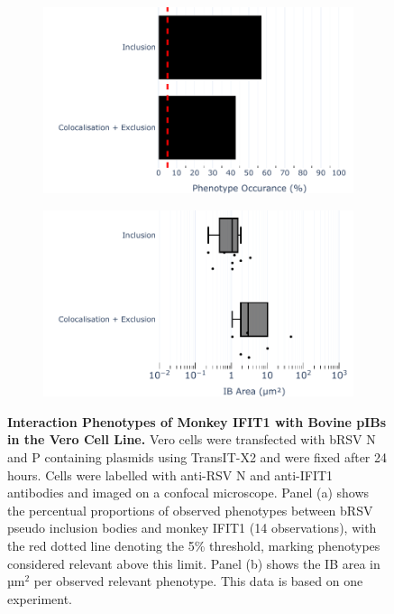 \begin{figure}
    \begin{subfigure}{0.495\textwidth}
        \caption{}
        \includegraphics[width=1\linewidth]{09. Chapter 4/Figs/01. pIB/02. IFIT1/07. bar_i1_vero_bnbp.pdf}  
    \end{subfigure}
    \begin{subfigure}{0.495\textwidth}
        \caption{}
        \includegraphics[width=1\linewidth]{09. Chapter 4/Figs/01. pIB/02. IFIT1/08. box_i1_vero_bnbp.pdf}
    \end{subfigure}
    \caption[Interaction Phenotypes of Monkey IFIT1 with Bovine pIBs in the Vero Cell Line.]{\textbf{Interaction Phenotypes of Monkey IFIT1 with Bovine pIBs in the Vero Cell Line.} Vero cells were transfected with bRSV N and P containing plasmids using TransIT-X2 and were fixed after 24 hours. Cells were labelled with anti-RSV N and anti-IFIT1 antibodies and imaged on a confocal microscope. Panel (a) shows the percentual proportions of observed phenotypes between bRSV pseudo inclusion bodies and monkey IFIT1 (14 observations), with the red dotted line denoting the 5\% threshold, marking phenotypes considered relevant above this limit. Panel (b) shows the IB area in \(\mbox{µm}^2\) per observed relevant phenotype. This data is based on one experiment.}
    \label{fig:Interaction Phenotypes of Monkey IFIT1 with Bovine pIBs in the VERO Cell Line}
\end{figure}

